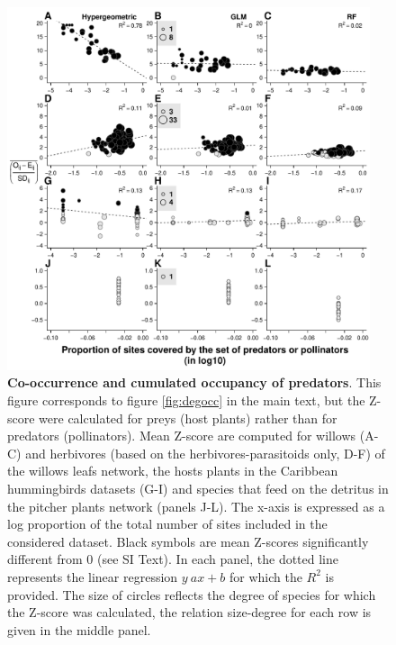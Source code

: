 \begin{figure}
\centering
\includegraphics[width=0.95000\textwidth]{chapitre3/figS8.pdf}
\caption{\textbf{Co-occurrence and cumulated occupancy of predators}.
This figure corresponds to figure \ref{fig:degocc} in the main text, but
the Z-score were calculated for preys (host plants) rather than for
predators (pollinators). Mean Z-score are computed for willows (A-C) and
herbivores (based on the herbivores-parasitoids only, D-F) of the
willows leafs network, the hosts plants in the Caribbean hummingbirds
datasets (G-I) and species that feed on the detritus in the pitcher
plants network (panels J-L). The x-axis is expressed as a log proportion
of the total number of sites included in the considered dataset. Black
symbols are mean Z-scores significantly different from 0 (see SI Text).
In each panel, the dotted line represents the linear regression
\(y~ax+b\) for which the \(R^2\) is provided. The size of circles
reflects the degree of species for which the Z-score was calculated, the
relation size-degree for each row is given in the middle
panel.\label{fig:degocc2}}
\end{figure}

\newpage

